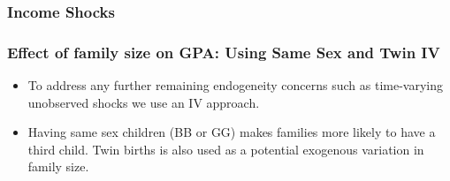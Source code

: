 \documentclass{beamer}
\begin{document}
\begin{frame}
    \label{frame:incomeshocks}
    \frametitle{Income Shocks}
     

     {
    }
\end{frame}



\begin{frame}
    \label{frame:iv_intro}
    \frametitle{Effect of family size on GPA: Using Same Sex and Twin IV}
    \begin{itemize}
        \item To address any further remaining endogeneity concerns such as time-varying unobserved shocks we use an IV approach.
        \item Having same sex children (BB or GG) makes families more likely to have a third child. Twin births is also used as a potential exogenous variation in family size.
    \end{itemize}    
   
\end{frame}
\end{document}

